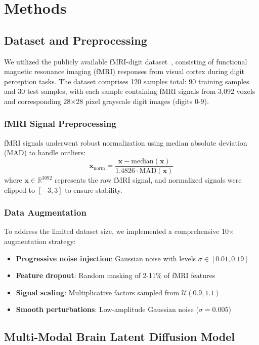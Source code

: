 \section{Methods}

\subsection{Dataset and Preprocessing}

We utilized the publicly available fMRI-digit dataset~\cite{dataset_ref}, consisting of functional magnetic resonance imaging (fMRI) responses from visual cortex during digit perception tasks. The dataset comprises 120 samples total: 90 training samples and 30 test samples, with each sample containing fMRI signals from 3,092 voxels and corresponding 28×28 pixel grayscale digit images (digits 0-9).

\subsubsection{fMRI Signal Preprocessing}
fMRI signals underwent robust normalization using median absolute deviation (MAD) to handle outliers:
\begin{equation}
\mathbf{x}_{\text{norm}} = \frac{\mathbf{x} - \text{median}(\mathbf{x})}{1.4826 \cdot \text{MAD}(\mathbf{x})}
\end{equation}
where $\mathbf{x} \in \mathbb{R}^{3092}$ represents the raw fMRI signal, and normalized signals were clipped to $[-3, 3]$ to ensure stability.

\subsubsection{Data Augmentation}
To address the limited dataset size, we implemented a comprehensive 10× augmentation strategy:
\begin{itemize}
    \item \textbf{Progressive noise injection}: Gaussian noise with levels $\sigma \in [0.01, 0.19]$
    \item \textbf{Feature dropout}: Random masking of 2-11\% of fMRI features
    \item \textbf{Signal scaling}: Multiplicative factors sampled from $\mathcal{U}(0.9, 1.1)$
    \item \textbf{Smooth perturbations}: Low-amplitude Gaussian noise ($\sigma = 0.005$)
\end{itemize}

\subsection{Multi-Modal Brain Latent Diffusion Model}

